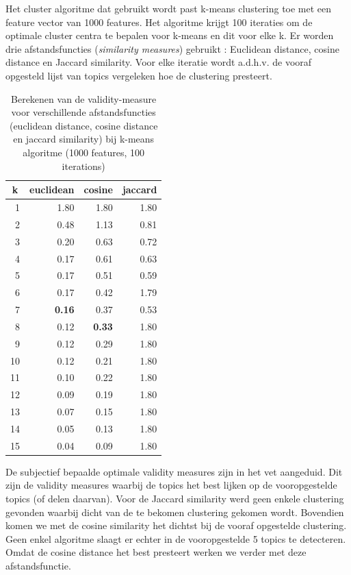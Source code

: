 Het cluster algoritme dat gebruikt wordt past k-means clustering toe met een feature vector van 1000 features. Het algoritme krijgt 100 iteraties om de optimale cluster centra te bepalen voor k-means en dit voor elke k. Er worden drie afstandsfuncties (\textit{similarity measures}) gebruikt \cite{Huang2008}: Euclidean distance, cosine distance en Jaccard similarity. Voor elke iteratie wordt a.d.h.v. de vooraf opgesteld lijst van topics vergeleken hoe de clustering presteert. 

\begin{table}[htbp]
  \centering
  \caption{Berekenen van de validity-measure voor verschillende afstandsfuncties (euclidean distance, cosine distance en jaccard similarity) bij k-means algoritme (1000 features, 100 iterations)}
    \begin{tabular}{rrrr}
    \toprule
    \multicolumn{1}{c}{k} & euclidean & cosine & jaccard \\
    \midrule
    1     & 1.80  & 1.80   & 1.80 \\
    2     & 0.48   & 1.13  & 0.81 \\
    3     & 0.20  & 0.63   & 0.72 \\
    4     & 0.17   & 0.61    & 0.63 \\
    5     & 0.17  & 0.51  & 0.59 \\
    6     & 0.17  & 0.42   & 1.79 \\
    7     & \textbf{0.16}  & 0.37  & 0.53 \\
    8     & 0.12  & \textbf{0.33}  & 1.80 \\
    9     & 0.12  & 0.29  & 1.80 \\
    10    & 0.12  & 0.21  & 1.80 \\
    11    & 0.10  & 0.22 & 1.80 \\
    12    & 0.09  & 0.19  & 1.80 \\
    13    & 0.07  & 0.15  & 1.80 \\
    14    & 0.05  & 0.13   & 1.80 \\
    15    & 0.04  & 0.09  & 1.80 \\
    \bottomrule
    \end{tabular}%
  \label{tab:clusters-validity}%
\end{table}%

De subjectief bepaalde optimale validity measures zijn in het vet aangeduid. Dit zijn de validity measures waarbij de topics het best lijken op de vooropgestelde topics (of delen daarvan). Voor de Jaccard similarity werd geen enkele clustering gevonden waarbij dicht van de te bekomen clustering gekomen wordt. Bovendien komen we met de cosine similarity het dichtst bij de vooraf opgestelde clustering. Geen enkel algoritme slaagt er echter in de vooropgestelde 5 topics te detecteren. Omdat de cosine distance het best presteert werken we verder met deze afstandsfunctie. 

